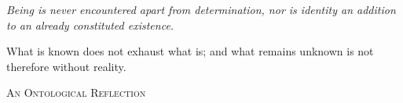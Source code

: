 

\cleardoublepage
\thispagestyle{empty}

\vspace*{\fill}

\begin{flushright}

    \begin{minipage}{0.78\textwidth}

        \begin{flushright}

            {\large\itshape
            Being is never encountered apart from determination,
            nor is identity an addition to an already constituted existence.
            }

            \vspace{1.5em}

            {\normalsize
            What is known does not exhaust what is;
            and what remains unknown is not therefore without reality.
            }

        \end{flushright}

        \vspace{2em}

        \begin{flushright}
            {\small\scshape
            An Ontological Reflection
            }
        \end{flushright}

    \end{minipage}

\end{flushright}

\vspace*{\fill}

\cleardoublepage

